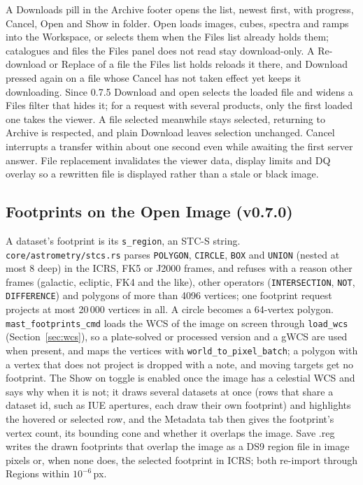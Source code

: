 \documentclass[11pt,a4paper]{article}
\newcommand{\code}[1]{\texttt{\small #1}}
\begin{document}
    A Downloads pill in the Archive footer opens the list, newest first, with progress, Cancel, Open and Show in folder. Open loads images, cubes, spectra and ramps into the Workspace, or selects them when the Files list already holds them; catalogues and files the Files panel does not read stay download-only. A Re-download or Replace of a file the Files list holds reloads it there, and Download pressed again on a file whose Cancel has not taken effect yet keeps it downloading. Since 0.7.5 Download and open selects the loaded file and widens a Files filter that hides it; for a request with several products, only the first loaded one takes the viewer. A file selected meanwhile stays selected, returning to Archive is respected, and plain Download leaves selection unchanged. Cancel interrupts a transfer within about one second even while awaiting the first server answer. File replacement invalidates the viewer data, display limits and DQ overlay so a rewritten file is displayed rather than a stale or black image.

    \subsection{Footprints on the Open Image (v0.7.0)}

    A dataset's footprint is its \code{s\_region}, an STC-S string. \code{core/astrometry/stcs.rs} parses \code{POLYGON}, \code{CIRCLE}, \code{BOX} and \code{UNION} (nested at most 8 deep) in the ICRS, FK5 or J2000 frames, and refuses with a reason other frames (galactic, ecliptic, FK4 and the like), other operators (\code{INTERSECTION}, \code{NOT}, \code{DIFFERENCE}) and polygons of more than 4096 vertices; one footprint request projects at most 20\,000 vertices in all. A circle becomes a 64-vertex polygon. \code{mast\_footprints\_cmd} loads the WCS of the image on screen through \code{load\_wcs} (Section~\ref{sec:wcs}), so a plate-solved or processed version and a gWCS are used when present, and maps the vertices with \code{world\_to\_pixel\_batch}; a polygon with a vertex that does not project is dropped with a note, and moving targets get no footprint. The Show on toggle is enabled once the image has a celestial WCS and says why when it is not; it draws several datasets at once (rows that share a dataset id, such as IUE apertures, each draw their own footprint) and highlights the hovered or selected row, and the Metadata tab then gives the footprint's vertex count, its bounding cone and whether it overlaps the image. Save .reg writes the drawn footprints that overlap the image as a DS9 region file in image pixels or, when none does, the selected footprint in ICRS; both re-import through Regions within $10^{-6}$\,px.
\end{document}
